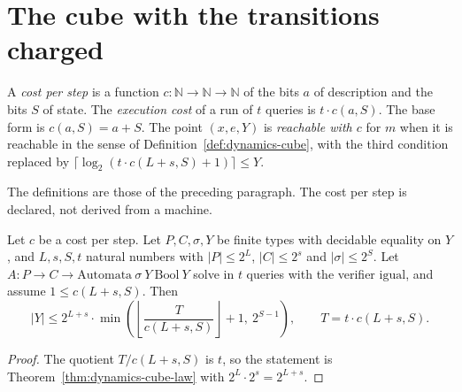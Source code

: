 \section{The cube with the transitions charged}
\label{sec:dynamics-transitions}

A \emph{cost per step} is a function $c : \mathbb{N} \to \mathbb{N} \to \mathbb{N}$ of the bits
$a$ of description and the bits $S$ of state. The \emph{execution cost} of a run of $t$ queries is
$t \cdot c(a, S)$. The base form is $c(a, S) = a + S$. The point $(x, e, Y)$ is
\emph{reachable with $c$} for $m$ when it is reachable in the sense of
Definition~\ref{def:dynamics-cube}, with the third condition replaced by
$\lceil \log_2 (t \cdot c(L+s, S) + 1) \rceil \le Y$.

\begin{definition}
  \label{def:dynamics-transition-cost}
  \leanok
  The definitions are those of the preceding paragraph. The cost per step is declared, not
  derived from a machine.
  \own{}
\end{definition}

\begin{theorem}
  \label{thm:dynamics-transition-law}
  \leanok
  Let $c$ be a cost per step. Let $P, C, \sigma, Y$ be finite types with decidable equality on $Y$,
  and $L, s, S, t$ natural numbers with $|P| \le 2^L$, $|C| \le 2^s$ and $|\sigma| \le 2^S$. Let
  $A : P \to C \to \mathrm{Automata}\ \sigma\ Y\ \mathrm{Bool}\ Y$ solve in $t$ queries with the
  verifier $\mathrm{igual}$, and assume $1 \le c(L+s, S)$. Then
  \[
    |Y| \le 2^{L+s} \cdot \min\!\left(\left\lfloor \frac{T}{c(L+s, S)} \right\rfloor + 1,\ 2^{S-1}\right),
    \qquad T = t \cdot c(L+s, S).
  \]
  \own{}
\end{theorem}

\begin{proof}
  \leanok
  The quotient $T / c(L+s, S)$ is $t$, so the statement is Theorem~\ref{thm:dynamics-cube-law}
  with $2^L \cdot 2^s = 2^{L+s}$.
\end{proof}

